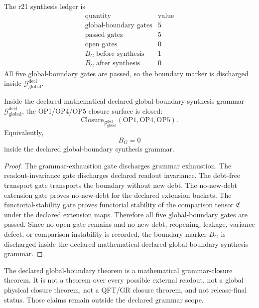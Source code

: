 \begin{proposition}
The r21 synthesis ledger is
\[
\begin{array}{c|r}
\text{quantity} & \text{value}\\
\hline
\text{global-boundary gates} & 5\\
\text{passed gates} & 5\\
\text{open gates} & 0\\
B_G\ \text{before synthesis} & 1\\
B_G\ \text{after synthesis} & 0
\end{array}
\]
All five global-boundary gates are passed, so the boundary marker is
discharged inside \(\mathcal G_{\mathrm{global}}^{\mathrm{decl}}\).
\end{proposition}

\begin{theorem}
Inside the declared mathematical declared global-boundary synthesis grammar
\(\mathcal G_{\mathrm{global}}^{\mathrm{decl}}\), the OP1/OP4/OP5 closure
surface is closed:
\[
    \mathrm{Closure}_{\mathcal G_{\mathrm{global}}^{\mathrm{decl}}}
    (\mathrm{OP1},\mathrm{OP4},\mathrm{OP5}).
\]
Equivalently,
\[
    B_G=0
\]
inside the declared global-boundary synthesis grammar.
\end{theorem}

\begin{proof}
The grammar-exhaustion gate discharges grammar exhaustion.  The readout-invariance gate discharges
declared readout invariance.  The debt-free transport gate transports the boundary without
new debt.  The no-new-debt extension gate proves no-new-debt for the declared extension
buckets.  The functorial-stability gate proves functorial stability of the comparison tensor
\(\mathfrak C\) under the declared extension maps.  Therefore all five
global-boundary gates are passed.  Since no open gate remains and no new debt,
reopening, leakage, variance defect, or comparison-instability is recorded, the
boundary marker \(B_G\) is discharged inside the declared mathematical
declared global-boundary synthesis grammar.
\end{proof}

\begin{remark}
The declared global-boundary theorem is a mathematical grammar-closure theorem.
It is not a theorem over every possible external readout, not a global physical
closure theorem, not a QFT/GR closure theorem, and not release-final status.
Those claims remain outside the declared grammar scope.
\end{remark}



